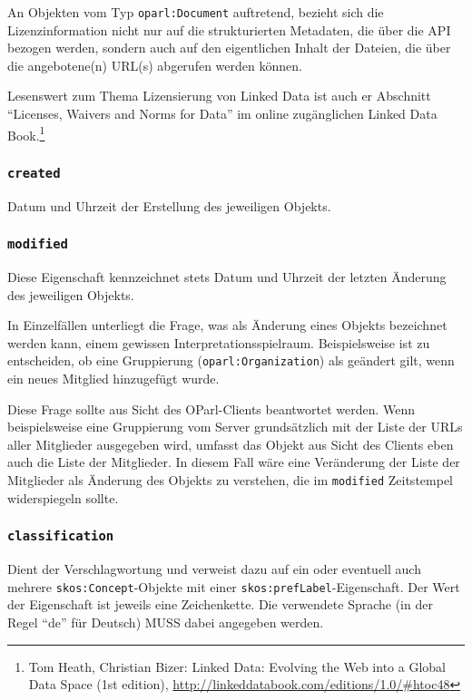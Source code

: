 \documentclass[,a4paper]{article}
\begin{document}
An Objekten vom Typ \texttt{oparl:Document} auftretend, bezieht sich die
Lizenzinformation nicht nur auf die strukturierten Metadaten, die über
die API bezogen werden, sondern auch auf den eigentlichen Inhalt der
Dateien, die über die angebotene(n) URL(s) abgerufen werden können.

Lesenswert zum Thema Lizensierung von Linked Data ist auch er Abschnitt
``Licenses, Waivers and Norms for Data'' im online zugänglichen Linked
Data Book.\footnote{Tom Heath, Christian Bizer: Linked Data: Evolving
  the Web into a Global Data Space (1st edition),
  \url{http://linkeddatabook.com/editions/1.0/\#htoc48}}

\subsubsection{\texttt{created}}\label{created}

Datum und Uhrzeit der Erstellung des jeweiligen Objekts.

\subsubsection{\texttt{modified}}\label{modified}

Diese Eigenschaft kennzeichnet stets Datum und Uhrzeit der letzten
Änderung des jeweiligen Objekts.

In Einzelfällen unterliegt die Frage, was als Änderung eines Objekts
bezeichnet werden kann, einem gewissen Interpretationsspielraum.
Beispielsweise ist zu entscheiden, ob eine Gruppierung
(\texttt{oparl:Organization}) als geändert gilt, wenn ein neues Mitglied
hinzugefügt wurde.

Diese Frage sollte aus Sicht des OParl-Clients beantwortet werden. Wenn
beispielsweise eine Gruppierung vom Server grundsätzlich mit der Liste
der URLs aller Mitglieder ausgegeben wird, umfasst das Objekt aus Sicht
des Clients eben auch die Liste der Mitglieder. In diesem Fall wäre eine
Veränderung der Liste der Mitglieder als Änderung des Objekts zu
verstehen, die im \texttt{modified} Zeitstempel widerspiegeln sollte.

\subsubsection{\texttt{classification}}\label{classification}

Dient der Verschlagwortung und verweist dazu auf ein oder eventuell auch
mehrere \texttt{skos:Concept}-Objekte mit einer
\texttt{skos:prefLabel}-Eigenschaft. Der Wert der Eigenschaft ist
jeweils eine Zeichenkette. Die verwendete Sprache (in der Regel ``de''
für Deutsch) MUSS dabei angegeben werden.
\end{document}
